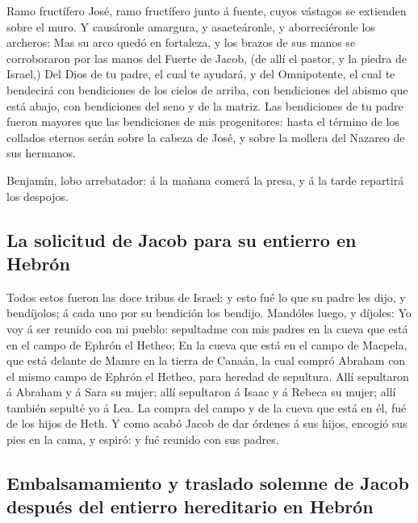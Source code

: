  Ramo fructífero José, ramo fructífero junto á fuente,
cuyos vástagos se extienden sobre el muro.  Y causáronle
amargura, y asaeteáronle, y aborreciéronle los archeros: 
Mas su arco quedó en fortaleza, y los brazos de sus manos se
corroboraron por las manos del Fuerte de Jacob, (de allí el pastor, y la
piedra de Israel,)  Del Dios de tu padre, el cual te
ayudará, y del Omnipotente, el cual te bendecirá con bendiciones de los
cielos de arriba, con bendiciones del abismo que está abajo, con
bendiciones del seno y de la matriz.  Las bendiciones de tu
padre fueron mayores que las bendiciones de mis progenitores: hasta el
término de los collados eternos serán sobre la cabeza de José, y sobre
la mollera del Nazareo de sus hermanos.

 Benjamín, lobo arrebatador: á la mañana comerá la presa, y
á la tarde repartirá los despojos.

\hypertarget{la-solicitud-de-jacob-para-su-entierro-en-hebruxf3n}{%
\subsection{La solicitud de Jacob para su entierro en
Hebrón}\label{la-solicitud-de-jacob-para-su-entierro-en-hebruxf3n}}

 Todos estos fueron las doce tribus de Israel: y esto fué
lo que su padre les dijo, y bendíjolos; á cada uno por su bendición los
bendijo.  Mandóles luego, y díjoles: Yo voy á ser reunido
con mi pueblo: sepultadme con mis padres en la cueva que está en el
campo de Ephrón el Hetheo;  En la cueva que está en el
campo de Macpela, que está delante de Mamre en la tierra de Canaán, la
cual compró Abraham con el mismo campo de Ephrón el Hetheo, para heredad
de sepultura.  Allí sepultaron á Abraham y á Sara su mujer;
allí sepultaron á Isaac y á Rebeca su mujer; allí también sepulté yo á
Lea.  La compra del campo y de la cueva que está en él, fué
de los hijos de Heth.  Y como acabó Jacob de dar órdenes á
sus hijos, encogió sus pies en la cama, y espiró: y fué reunido con sus
padres.

\hypertarget{embalsamamiento-y-traslado-solemne-de-jacob-despuuxe9s-del-entierro-hereditario-en-hebruxf3n}{%
\subsection{Embalsamamiento y traslado solemne de Jacob después del
entierro hereditario en
Hebrón}\label{embalsamamiento-y-traslado-solemne-de-jacob-despuuxe9s-del-entierro-hereditario-en-hebruxf3n}}

